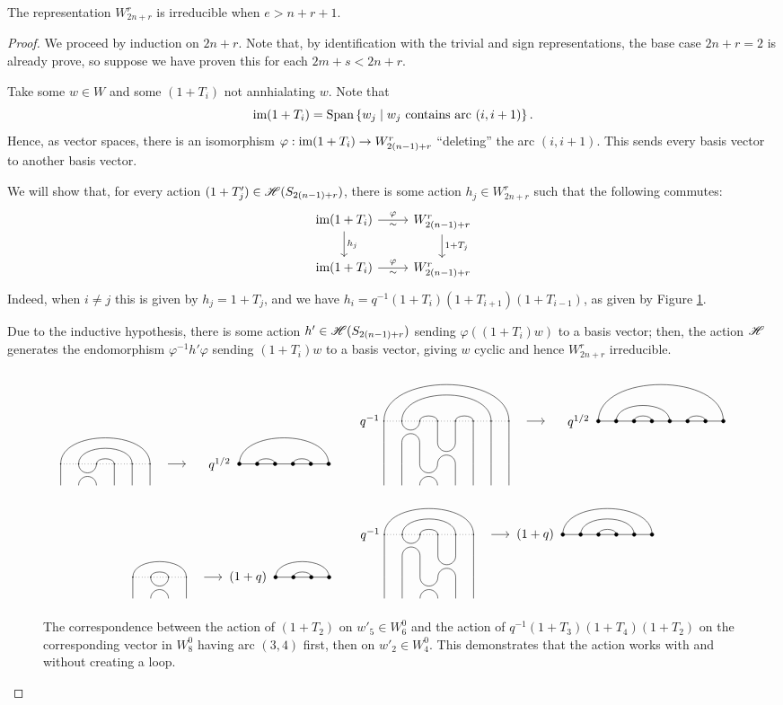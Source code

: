 \documentclass{amsart}
\begin{document}
\begin{proposition}
  The representation $W_{2n + r}^r$ is irreducible when $e > n + r + 1$. 
\end{proposition}
\begin{proof}
  We proceed by induction on $2n + r$.
  Note that, by identification with the trivial and sign representations, the base case $2n + r = 2$ is already prove, so suppose we have proven this for each $2m + s < 2n + r$.

  Take some $w \in W$ and some $(1 + T_i)$ not annhialating $w$.
  Note that \[\text{im} (1 + T_i) = \text{Span}\left\{ w_j \mid w_j \text{ contains arc }(i,i+1) \right\}.\]
  Hence, as vector spaces, there is an isomorphism $\varphi:\text{im}(1 + T_i) \rightarrow W_{2(n-1) + r}^r$ ``deleting'' the arc $(i,i+1)$.
  This sends every basis vector to another basis vector.

  We will show that, for every action $(1 + T_j') \in \mathscr{H}(S_{2(n-1) + r})$, there is some action $h_j \in W_{2n + r}^r$ such that the following commutes:
  \[
    \begin{tikzcd}
      \ima (1 + T_i) \arrow[r,"\varphi" above, "\sim" below] \arrow[d,"h_j"] & W_{2(n-1) + r}^r \arrow[d,"1 + T_j"]\\
      \ima (1 + T_i) \arrow[r,"\varphi" above, "\sim" below] & W_{2(n-1) + r}^r
    \end{tikzcd}
  \]
  Indeed, when $i \neq j$ this is given by $h_j = 1 + T_j$, and we have $h_i = q^{-1}(1 + T_i)(1 + T_{i+1})(1 + T_{i-1})$, as given by Figure \ref{bigloop}.
  
  Due to the inductive hypothesis, there is some action $h' \in \mathscr{H}(S_{2(n-1) + r})$ sending $\varphi((1 + T_i)w)$ to a basis vector;
  then, the action $\mathscr{H}$ generates the endomorphism $\varphi^{-1}h'\varphi$ sending $(1 + T_i)w$ to a basis vector, giving $w$ cyclic and hence $W_{2n + r}^r$ irreducible.
  \begin{figure}
  \[
    \Action{6}{1/6, 2/5, 3/4}{2}{1/6, 2/3, 4/5 }{q^{1/2}} \hspace{20pt} 
    \IsoAction{8}{1/8, 2/7, 3/4, 5/6}{3}{1/8, 2/5, 3/4, 6/7}{q^{1/2}}
  \]
  \[
    \Action{4}{1/4, 2/3}{2}{1/4,2/3}{(1 + q)} \hspace{20pt}
    \IsoAction{6}{1/6, 2/5, 3/4}{3}{1/6, 2/5, 3/4}{(1 + q)}
  \]
  \caption{The correspondence between the action of $(1 + T_2)$ on $w'_5 \in W^0_6$ and the action of $q^{-1}(1 + T_3)(1 + T_4)(1 + T_2)$ on the corresponding vector in $W^0_8$ having arc $(3,4)$ first, then on $w'_2 \in W^0_4$.
  This demonstrates that the action works with and without creating a loop.
  }
  \label{bigloop}
  \end{figure}
\end{proof}
\end{document}
